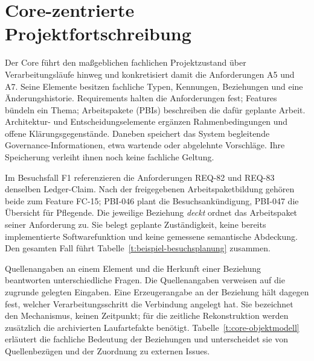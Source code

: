 \section{Core-zentrierte Projektfortschreibung}
\label{sec:core-projektfortschreibung}

Der Core führt den maßgeblichen fachlichen Projektzustand über
Verarbeitungsläufe hinweg und konkretisiert damit die Anforderungen
A5 und A7. Seine Elemente besitzen fachliche Typen, Kennungen,
Beziehungen und eine Änderungshistorie. Requirements halten die
Anforderungen fest; Features bündeln ein Thema; Arbeitspakete
(PBIs) beschreiben die dafür geplante Arbeit. Architektur- und
Entscheidungselemente ergänzen Rahmenbedingungen und offene
Klärungsgegenstände. Daneben speichert das System begleitende
Governance-Informationen, etwa wartende oder abgelehnte Vorschläge.
Ihre Speicherung verleiht ihnen noch keine fachliche Geltung.

Im Besuchsfall F1 referenzieren die Anforderungen REQ-82 und REQ-83
denselben Ledger-Claim. Nach der freigegebenen Arbeitspaketbildung
gehören beide zum Feature FC-15; PBI-046 plant die Besuchsankündigung,
PBI-047 die Übersicht für Pflegende. Die jeweilige Beziehung
\emph{deckt} ordnet das Arbeitspaket seiner Anforderung zu.
Sie belegt geplante Zuständigkeit, keine bereits implementierte
Softwarefunktion und keine gemessene semantische Abdeckung.
Den gesamten Fall führt Tabelle~\ref{t:beispiel-besuchsplanung} zusammen.

Quellenangaben an einem Element und die Herkunft einer Beziehung
beantworten unterschiedliche Fragen. Die Quellenangaben verweisen
auf die zugrunde gelegten Eingaben. Eine Erzeugerangabe an der Beziehung
hält dagegen fest, welcher Verarbeitungsschritt die Verbindung
angelegt hat. Sie bezeichnet den Mechanismus, keinen Zeitpunkt;
für die zeitliche Rekonstruktion werden zusätzlich die archivierten
Laufartefakte benötigt. Tabelle~\ref{t:core-objektmodell} erläutert
die fachliche Bedeutung der Beziehungen und unterscheidet sie von
Quellenbezügen und der Zuordnung zu externen Issues.



